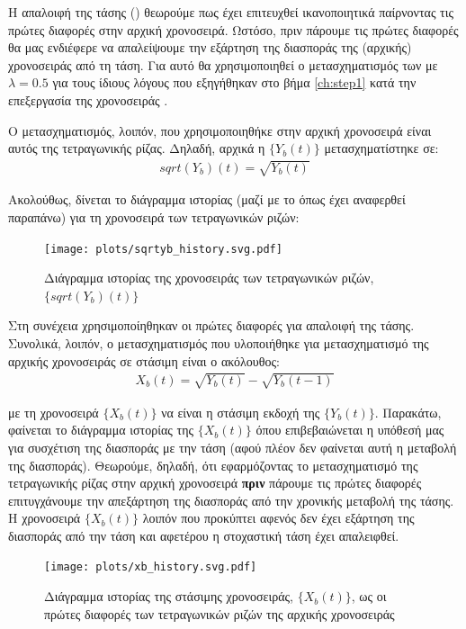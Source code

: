 Η απαλοιφή της τάσης () θεωρούμε πως έχει επιτευχθεί ικανοποιητικά παίρνοντας τις πρώτες διαφορές στην αρχική χρονοσειρά. Ωστόσο, πριν πάρουμε τις πρώτες διαφορές θα μας ενδιέφερε να απαλείψουμε την εξάρτηση της διασποράς της (αρχικής) χρονοσειράς από τη τάση. Για αυτό θα χρησιμοποιηθεί ο μετασχηματισμός των  με $\lambda=0.5$ για τους ίδιους λόγους που εξηγήθηκαν στο βήμα \ref{ch:step1} κατά την επεξεργασία της χρονοσειράς .

Ο μετασχηματισμός, λοιπόν, που χρησιμοποιηθήκε στην αρχική χρονοσειρά  είναι αυτός της τετραγωνικής ρίζας. Δηλαδή, αρχικά η $\{Y_b(t)\}$ μετασχηματίστηκε σε:
\begin{align}
    sqrt(Y_b)(t) = \sqrt{Y_b(t)}
\end{align}

Ακολούθως, δίνεται το διάγραμμα ιστορίας (μαζί με το  όπως έχει αναφερθεί παραπάνω) για τη χρονοσειρά των τετραγωνικών ριζών:

\begin{figure}[H]
    \begin{center}
        \texttt{[image: plots/sqrtyb\_history.svg.pdf]}
        \caption{Διάγραμμα ιστορίας της χρονοσειράς των τετραγωνικών ριζών, $\{sqrt(Y_b)(t)\}$}
        \label{fig:sqrtyb_history}
    \end{center}
\end{figure}

Στη συνέχεια χρησιμοποίηθηκαν οι πρώτες διαφορές για απαλοιφή της τάσης. Συνολικά, λοιπόν, ο μετασχηματισμός που υλοποιήθηκε για μετασχηματισμό της αρχικής χρονοσειράς σε στάσιμη είναι ο ακόλουθος:
\begin{align}
    X_b(t) = \sqrt{Y_b(t)} - \sqrt{Y_b(t-1)}
\end{align}

με τη χρονοσειρά $\{X_b(t)\}$ να είναι η στάσιμη εκδοχή της $\{Y_b(t)\}$. Παρακάτω, φαίνεται το διάγραμμα ιστορίας της $\{X_b(t)\}$ όπου επιβεβαιώνεται η υπόθεσή μας για συσχέτιση της διασποράς με την τάση (αφού πλέον δεν φαίνεται αυτή η  μεταβολή της διασποράς). Θεωρούμε, δηλαδή, ότι εφαρμόζοντας το μετασχηματισμό της τετραγωνικής ρίζας στην αρχική χρονοσειρά \textbf{πριν} πάρουμε τις πρώτες διαφορές επιτυγχάνουμε την απεξάρτηση της διασποράς από την χρονικής μεταβολή της τάσης. Η χρονοσειρά $\{X_b(t)\}$ λοιπόν που προκύπτει αφενός δεν έχει εξάρτηση της διασποράς από την τάση και αφετέρου η στοχαστική τάση έχει απαλειφθεί.

\begin{figure}[H]
    \begin{center}
        \texttt{[image: plots/xb\_history.svg.pdf]}
        \caption{Διάγραμμα ιστορίας της στάσιμης χρονοσειράς, $\{X_b(t)\}$, ως οι πρώτες διαφορές των τετραγωνικών ριζών της αρχικής χρονοσειράς}
        \label{fig:xb_history}
    \end{center}
\end{figure}


